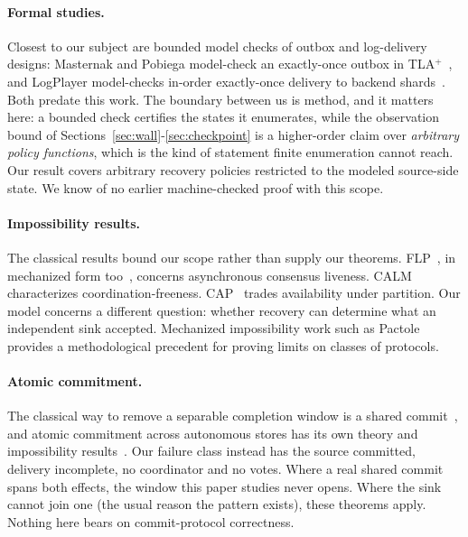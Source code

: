 \documentclass[sigplan,10pt]{acmart}
\theoremstyle{plain}
\theoremstyle{definition}
\begin{document}
\paragraph{Formal studies.}
Closest to our subject are bounded model checks of outbox and
log-delivery designs:
Masternak and Pobiega model-check an exactly-once outbox in
TLA$^{+}$~\cite{masternak}, and LogPlayer model-checks in-order
exactly-once delivery to backend shards~\cite{logplayer}. Both predate
this work. The boundary between us is method, and it matters here: a
bounded check certifies the states it enumerates, while the observation bound of
Sections~\ref{sec:wall}-\ref{sec:checkpoint} is a higher-order claim
over \emph{arbitrary policy functions}, which is the kind of
statement finite enumeration cannot reach. Our result covers arbitrary recovery policies restricted to the modeled
source-side state. We know of no earlier machine-checked proof with this
scope.

\paragraph{Impossibility results.}
The classical results bound our scope rather than supply our
theorems. FLP~\cite{flp-jacm}, in mechanized form
too~\cite{flp-afp}, concerns asynchronous consensus liveness.
CALM~\cite{hellerstein2020calm} characterizes coordination-freeness.
CAP~\cite{gilbert2002cap} trades availability under partition.
Our model concerns a different question: whether recovery can determine
what an independent sink accepted. Mechanized impossibility work such as
Pactole~\cite{auger2013pactole} provides a methodological precedent for
proving limits on classes of protocols.

\paragraph{Atomic commitment.}
The classical way to remove a separable completion window is a shared
commit~\cite{gray78}, and atomic commitment across autonomous stores
has its own theory and impossibility
results~\cite{mullen1992impossibility,guerraoui1995nbac}. Our failure
class instead has the source committed, delivery incomplete,
no coordinator and no votes. Where a real shared commit spans both
effects, the window this paper studies never opens. Where the sink
cannot join one (the usual reason the pattern exists), these
theorems apply. Nothing here bears on commit-protocol correctness.
\end{document}
